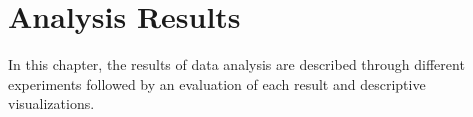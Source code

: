 \section{Analysis Results}
\label{sec:results}

In this chapter, the results of data analysis are described through different experiments followed by an evaluation of each result and descriptive visualizations.



